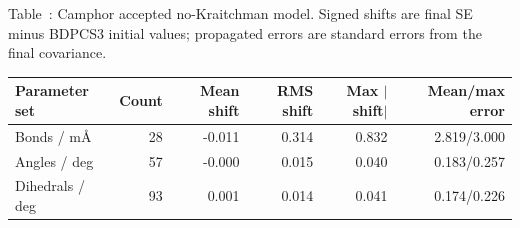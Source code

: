 \begin{center}
\label{tab:si-camphor-geometry-statistics}
\parbox{0.94\linewidth}{\small\raggedright Table~\thetable: Camphor accepted no-Kraitchman model. Signed shifts are final SE minus BDPCS3 initial values; propagated errors are standard errors from the final covariance.\par}
\smallskip
\footnotesize
\begin{tabular}{lrrrrr}
\toprule
Parameter set & Count & Mean shift & RMS shift & Max $|$shift$|$ & Mean/max error \\
\midrule
Bonds / m\AA{} & 28 & -0.011 & 0.314 & 0.832 & 2.819/3.000 \\
Angles / deg & 57 & -0.000 & 0.015 & 0.040 & 0.183/0.257 \\
Dihedrals / deg & 93 & 0.001 & 0.014 & 0.041 & 0.174/0.226 \\
\bottomrule
\end{tabular}
\end{center}
